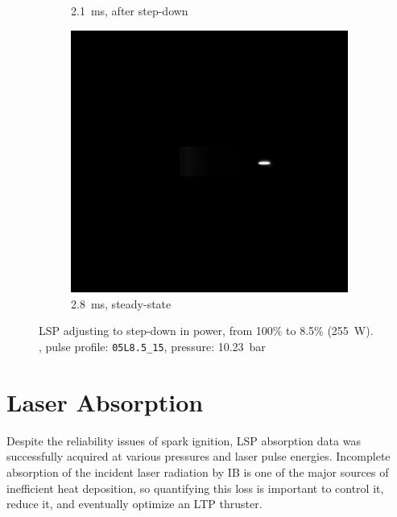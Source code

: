 \begin{figure}[h]
\begin{subfigure}[t]{0.32\textwidth}
                    \caption{\qty{2.1}{ms}, after step-down}
                    \label{fig:lsp_stepdown_21}
                \end{subfigure}
                \hfill
                \begin{subfigure}[t]{0.32\textwidth}
                    \centering
                    \includegraphics[trim=7.6in 5.3in 2.4in 5.5in, clip, width=\textwidth]{assets/5 results/LSP34_PS28/28.jpg}
                    \caption{\qty{2.8}{ms}, steady-state}
                    \label{fig:lsp_stepdown_28}
                \end{subfigure}
                \caption[LSP adjusting to step-down in power]{LSP adjusting to step-down in power, from 100\% to 8.5\% (\qty{255}{W}). , pulse profile: \texttt{05L8.5\_15}, pressure: \qty{10.23}{bar}}
                \label{fig:lsp_stepdown}
            \end{figure}

    \clearpage
    \section{Laser Absorption} \label{sec:exp_absorption}
        Despite the reliability issues of spark ignition, LSP absorption data was successfully acquired at various pressures and laser pulse energies. Incomplete absorption of the incident laser radiation by IB is one of the major sources of inefficient heat deposition, so quantifying this loss is important to control it, reduce it, and  eventually optimize an LTP thruster.
        
